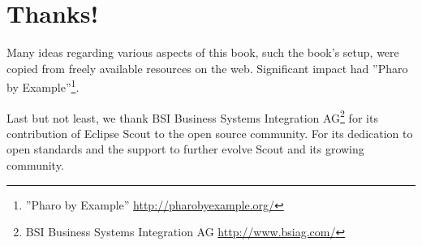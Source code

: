 \documentclass[a4paper,10pt,twoside]{book}
\begin{document}
\section*{Thanks!}

Many ideas regarding various aspects of this book, such the book's setup, were copied from freely available resources on the web. 
Significant impact had ''Pharo by Example''\footnote{''Pharo by Example'' \url{http://pharobyexample.org/}}.

Last but not least, we thank BSI Business Systems Integration 
AG\footnote{BSI Business Systems Integration AG \url{http://www.bsiag.com/}} for its contribution of Eclipse Scout to the open source community.
For its dedication to open standards and the support to further evolve Scout and its growing community.


\ifx\wholebook\relax\else
   
   
\end{document}
